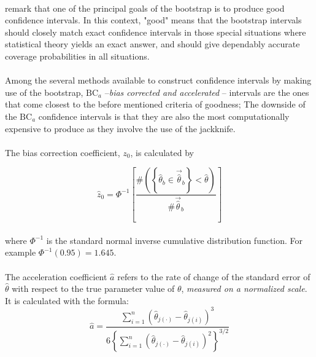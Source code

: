 \documentclass[letterpaper]{article}
\begin{document}
\paragraph{}
\cite{efron1994introduction} remark that one of the principal goals of the bootstrap is to produce good confidence intervals. In this context, "good" means that the bootstrap intervals should closely match exact confidence intervals in those special situations where statistical theory yields an exact answer, and should give dependably accurate coverage probabilities in all situations. 

\paragraph{}
Among the several methods available to construct confidence intervals by making use of the bootstrap, $\mathrm{BC}_a$ --\textit{bias corrected and accelerated} -- intervals are the ones that come closest to the before mentioned criteria of goodness; The downside of the $\mathrm{BC}_a$ confidence intervals is that they are also the most computationally expensive to produce as they involve the use of the jackknife.

\paragraph{}
The bias correction coefficient, $z_0$, is calculated by

\begin{equation}
    \hat{z}_0=\Phi^{-1}\left[\frac{\#\left(\left\{\hat{\theta}_b\in\vec{\hat{\theta}}_b\right\}<\hat{\theta}\right)}{\#\vec{\hat{\theta}}_b}\right]
\end{equation}
\paragraph{}
where $\Phi^{-1}$ is the standard normal inverse cumulative distribution function. For example $\Phi^{-1}(0.95)=1.645$.

\paragraph{}
The acceleration coefficient $\hat{a}$ refers to the rate of change of the standard error of $\hat{\theta}$ with respect to the true parameter value of $\theta$, \textit{measured on a normalized scale}. It is calculated with the formula:
\begin{equation}
    \hat{a}=\frac{\sum_{i=1}^{n}\left(\hat{\theta}_{j(\cdot)}-\hat{\theta}_{j(i)}\right)^3}{6\left\{\sum_{i=1}^{n}\left(\hat{\theta}_{j(\cdot)}-\hat{\theta}_{j(i)}\right)^2\right\}^{3/2}}
\end{equation}
\end{document}
